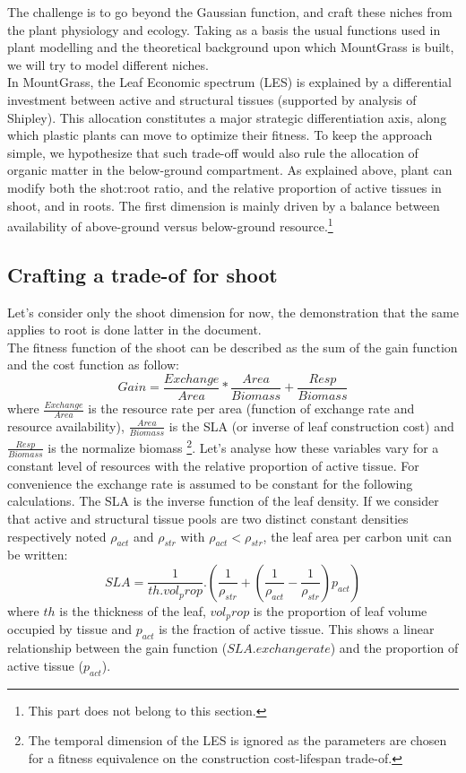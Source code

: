 \documentclass[a4paper, justified,marginals=raggedright]{tufte-handout}
\begin{document}
The challenge is to go beyond the Gaussian function, and craft these niches from the plant physiology and ecology. Taking as a basis the usual functions used in plant modelling and the theoretical background upon which MountGrass is built, we will try to model different niches.\\

\indent In MountGrass, the Leaf Economic spectrum (LES)\cite{Wright-2004} is explained by a differential investment between active and structural tissues (supported by analysis of Shipley\cite{Shipley}). This allocation constitutes a major strategic differentiation axis, along which plastic plants can move to optimize their fitness. To keep the approach simple, we hypothesize that such trade-off would also rule the allocation of organic matter in the below-ground compartment\cite{Reich-2014; Tjoelker-2005}. As explained above, plant can modify both the shot:root ratio, and the relative proportion of active tissues in shoot, and in roots. The first dimension is mainly driven by a balance between availability of above-ground versus below-ground resource.\footnote{This part does not belong to this section.}\\
\subsection{Crafting a trade-of for shoot}
\indent Let's consider only the shoot dimension for now, the demonstration that the same applies to root is done latter in the document.\\
\indent The fitness function of the shoot can be described as the sum of the gain function and the cost function as follow:
\begin{equation}
Gain = \frac{Exchange}{Area} * \frac{Area}{Biomass} + \frac{Resp}{Biomass}
\end{equation}
where $\frac{Exchange}{Area}$ is the resource rate per area (function of exchange rate and resource availability), $\frac{Area}{Biomass}$ is the SLA (or inverse of leaf construction cost) and $\frac{Resp}{Biomass}$ is the normalize biomass \footnote{The temporal dimension of the LES is ignored as the parameters are chosen for a fitness equivalence on the construction cost-lifespan trade-of.}. Let's analyse how these variables vary for a constant level of resources with the relative proportion of active tissue. For convenience the exchange rate is assumed to be constant for the following calculations.
The SLA is the inverse function of the leaf density. If we consider that active and structural tissue pools are two distinct constant densities respectively noted $\rho_{act}$ and $\rho_{str}$ with $\rho_{act} < \rho_{str}$, the leaf area per carbon unit can be written:
\begin{equation}
SLA = \frac{1}{th . vol_prop}. (\frac{1}{\rho_{str}}+(\frac{1}{\rho_{act}}-\frac{1}{\rho_{str}})p_{act})
\end{equation}
where $th$ is the thickness of the leaf, $vol_prop$ is the proportion of leaf volume occupied by tissue and $p_{act}$ is the fraction of active tissue. This shows a linear relationship between the gain function ($SLA . exchange rate$) and the proportion of active tissue ($p_{act}$).
\end{document}
